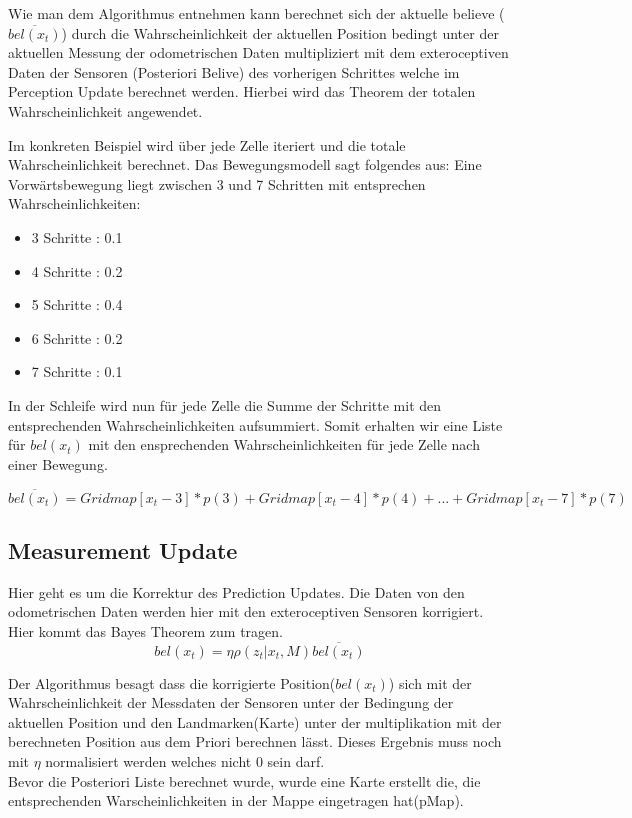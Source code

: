 \documentclass[12pt]{article}
\begin{document}
Wie man dem Algorithmus entnehmen kann berechnet sich der aktuelle 
believe ($\overline{bel(x_t)}$) durch die Wahrscheinlichkeit der aktuellen Position bedingt unter der aktuellen Messung der odometrischen Daten multipliziert mit dem exteroceptiven Daten der Sensoren (Posteriori Belive) des vorherigen Schrittes welche im Perception Update berechnet werden.
Hierbei wird das Theorem der totalen Wahrscheinlichkeit angewendet.

Im konkreten Beispiel wird über jede Zelle iteriert und die totale Wahrscheinlichkeit berechnet. Das Bewegungsmodell sagt folgendes aus:
Eine Vorwärtsbewegung liegt zwischen 3 und 7 Schritten mit entsprechen Wahrscheinlichkeiten:

\begin{itemize}
\item 3 Schritte  : 0.1
\item 4 Schritte : 0.2
\item 5 Schritte : 0.4
\item 6 Schritte : 0.2
\item 7 Schritte : 0.1
\end{itemize} 

In der Schleife wird nun für jede Zelle die Summe der Schritte mit den entsprechenden Wahrscheinlichkeiten aufsummiert. Somit erhalten wir eine Liste für $bel(x_t)$ mit den ensprechenden Wahrscheinlichkeiten für jede Zelle nach einer Bewegung.

$$\overline{bel(x_t)} = Gridmap[x_t-3] * p(3) + Gridmap[x_t-4] * p(4)+...+Gridmap[x_t-7] * p(7)$$

\subsection{Measurement Update} 
Hier geht es um die Korrektur des Prediction Updates. Die Daten von den odometrischen Daten werden hier mit den exteroceptiven Sensoren korrigiert. Hier kommt das Bayes Theorem zum tragen.
$$bel(x_t) = \eta\rho(z_t|x_t, M)\overline{bel(x_t)}$$

Der Algorithmus besagt dass die korrigierte Position($bel(x_t)$) sich mit der Wahrscheinlichkeit der Messdaten der Sensoren unter der Bedingung der aktuellen Position und den Landmarken(Karte) unter der multiplikation mit der berechneten Position aus dem Priori berechnen lässt. Dieses Ergebnis muss noch mit $\eta$ normalisiert werden welches nicht 0 sein darf.\\

Bevor die Posteriori Liste berechnet wurde, wurde eine Karte erstellt die, die entsprechenden Warscheinlichkeiten in der Mappe eingetragen hat(pMap).
\end{document}
